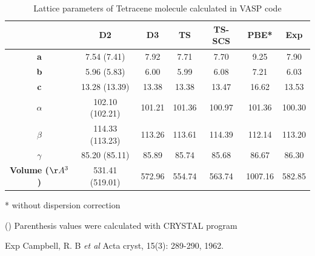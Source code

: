 \documentclass[12pt,a4paper,openany]{book}
\begin{document}
 
 	\begin{table}[t]
 		\caption{Lattice parameters of Tetracene molecule calculated in VASP code} \label{table13}
 		\begin{center}
 			\begin{threeparttable}
 				\begin{tabular}{c c c c c c c}
 					\toprule
 					& \textbf{D2} & \textbf{D3} & \textbf{TS} & \textbf{TS-SCS} & \textbf{PBE*} & \textbf{Exp} \\
 					\midrule
 					\textbf{a} &7.54 (7.41) &  7.92 & 7.71 & 7.70 & 9.25 & 7.90\\
 					\textbf{b}& 5.96 (5.83) & 6.00 & 5.99 & 6.08 & 7.21 & 6.03 \\
 					\textbf{c}& 13.28 (13.39) & 13.38 & 13.38 & 13.47 & 16.62 & 13.53 \\
 					\textbf{$\alpha$} & 102.10 (102.21) & 101.21 & 101.36 & 100.97 & 101.36 &100.30\\
 					\textbf{$\beta$} & 114.33 (113.23) & 113.26 & 113.61 & 114.39 & 112.14 & 113.20\\
 					\textbf{$\gamma$} &85.20 (85.11) & 85.89 & 85.74 & 85.68 & 86.67 & 86.30\\
 					\textbf{Volume ($\AA^{3}$)} & 531.41 (519.01) & 572.96 & 554.74 &  563.74 & 1007.16 & 582.85\\
 					\bottomrule
 				\end{tabular} 
 				
 				\begin{tablenotes}
 					\item[*] without dispersion correction
 					\item[()] Parenthesis values were calculated with CRYSTAL program
 					\item[Exp] Campbell, R. B \textit{et al} Acta cryst, 15(3): 289-290, 1962.
 				\end{tablenotes}
 			\end{threeparttable}
 		\end{center}
 	\end{table}
 	
\end{document}
